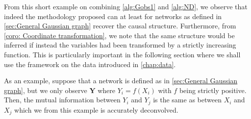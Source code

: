 \documentclass[../Thesis.tex]{subfiles}
\begin{document}
From this short example on combining \autoref{alg:Gobs1} and \autoref{alg:ND}, we observe that indeed the methodology proposed can at least for networks as defined in \autoref{sec:General Gaussian graph} recover the causal structure. Furthermore, from \autoref{coro: Coordinate transformation}, we note that the same structure would be inferred if instead the variables had been transformed by a strictly increasing function. This is particularly important in the following section where we shall use the framework on the data introduced in \autoref{chap:data}.

As an example, suppose that a network is defined as in \autoref{sec:General Gaussian graph}, but we only observe $\boldsymbol Y$ where $Y_i = f \left(X_i\right)$ with $f$ being strictly positive. Then, the mutual information between $Y_i$ and $Y_j$ is the same as between $X_i$ and $X_j$ which we from this example is accurately deconvolved.
\end{document}
